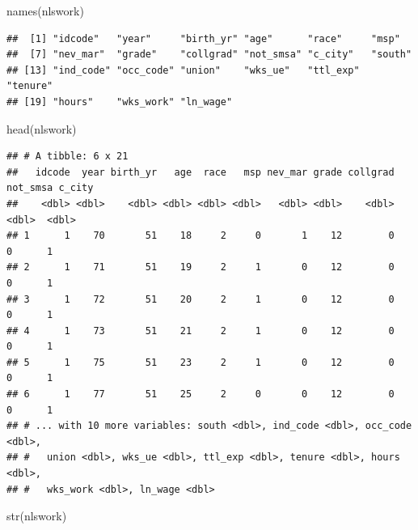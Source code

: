 \documentclass[
]{article}
\newenvironment{Shaded}{\begin{snugshade}}{\end{snugshade}}
\newcommand{\FunctionTok}[1]{\textcolor[rgb]{0.00,0.00,0.00}{#1}}
\newcommand{\NormalTok}[1]{#1}
\begin{document}
\begin{Shaded}
\begin{Highlighting}[]
  \FunctionTok{names}\NormalTok{(nlswork)}
\end{Highlighting}
\end{Shaded}

\begin{verbatim}
##  [1] "idcode"   "year"     "birth_yr" "age"      "race"     "msp"     
##  [7] "nev_mar"  "grade"    "collgrad" "not_smsa" "c_city"   "south"   
## [13] "ind_code" "occ_code" "union"    "wks_ue"   "ttl_exp"  "tenure"  
## [19] "hours"    "wks_work" "ln_wage"
\end{verbatim}

\begin{Shaded}
\begin{Highlighting}[]
  \FunctionTok{head}\NormalTok{(nlswork)}
\end{Highlighting}
\end{Shaded}

\begin{verbatim}
## # A tibble: 6 x 21
##   idcode  year birth_yr   age  race   msp nev_mar grade collgrad not_smsa c_city
##    <dbl> <dbl>    <dbl> <dbl> <dbl> <dbl>   <dbl> <dbl>    <dbl>    <dbl>  <dbl>
## 1      1    70       51    18     2     0       1    12        0        0      1
## 2      1    71       51    19     2     1       0    12        0        0      1
## 3      1    72       51    20     2     1       0    12        0        0      1
## 4      1    73       51    21     2     1       0    12        0        0      1
## 5      1    75       51    23     2     1       0    12        0        0      1
## 6      1    77       51    25     2     0       0    12        0        0      1
## # ... with 10 more variables: south <dbl>, ind_code <dbl>, occ_code <dbl>,
## #   union <dbl>, wks_ue <dbl>, ttl_exp <dbl>, tenure <dbl>, hours <dbl>,
## #   wks_work <dbl>, ln_wage <dbl>
\end{verbatim}

\begin{Shaded}
\begin{Highlighting}[]
  \FunctionTok{str}\NormalTok{(nlswork)}
\end{Highlighting}
\end{Shaded}
\end{document}
